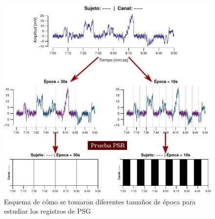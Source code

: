 \begin{figure}
\centering
\includegraphics[width=\linewidth]{./img_diagramas/epocas_diferentes_v2.pdf}
\caption{Esquema de cómo se tomaron diferentes tamaños de época para estudiar los registros de 
PSG}
\label{epocas_diferentes}
\end{figure}




